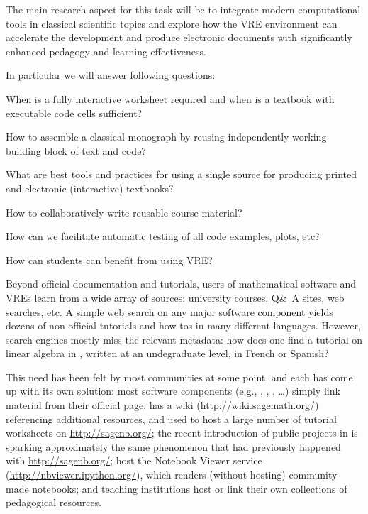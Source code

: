 \begin{workpackage}
\begin{tasklist}
\begin{task}[title=Demonstrator: Interactive books,
id=ibook,lead=US,partners={USO},PM=42,wphases={0-36,40-46}]
The main research aspect for this task will be to integrate modern
computational tools in classical scientific topics and explore how
the VRE environment can accelerate the development and produce electronic
documents with significantly enhanced pedagogy and learning effectiveness.

In particular we will answer following questions:
\begin{compactitem}
\item When is a fully interactive worksheet required and when is
  a textbook with executable code cells sufficient?
\item How to assemble a classical monograph by reusing independently working
  building block of text and code?
\item What are best tools and practices for using a single source for
  producing printed and electronic (interactive) textbooks?
\item How to collaboratively write reusable course material?
\item How can we facilitate automatic testing of all code examples, plots, etc?
\item How can students can benefit from using VRE?
\end{compactitem}


\end{task}

\begin{task}[title=Demonstrator: Computational mathematics resources indexing service,
id=index-librorum-salvificorum,lead=UV,PM=2,partners={UB},wphases=20-25] Beyond official documentation and
  tutorials, users of mathematical software and VREs learn from a wide
  array of sources: university courses, Q\&\ A sites, web searches,
  etc.  A simple web search on any major software component yields
  dozens of non-official tutorials and how-tos in many different
  languages. However, search engines mostly miss the relevant
  metadata: how does one find a tutorial on linear algebra in \PariGP,
  written at an undegraduate level, in French or Spanish?

This need has been felt by most communities at some point, and each
has come up with its own solution: most software components (e.g.,
\GAP, \PariGP, \Sage, \dots) simply link material from their official
page; \Sage has a wiki (\url{http://wiki.sagemath.org/}) referencing
additional resources, and used to host a large number of tutorial
worksheets on \url{http://sagenb.org/}; the recent introduction of
public projects in \SMC is sparking approximately the same phenomenon
that had previously happened with \url{http://sagenb.org/}; \IPython
host the Notebook Viewer service (\url{http://nbviewer.ipython.org/}),
which renders (without hosting) community-made notebooks; and teaching
institutions host or link their own collections of pedagogical
resources.


\end{task}
\end{tasklist}
\end{workpackage}
